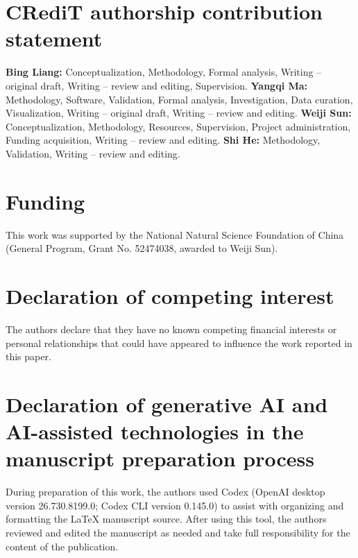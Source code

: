 \documentclass[preprint,12pt]{elsarticle}
\theoremstyle{definition}
\begin{document}
\section*{CRediT authorship contribution statement}
\textbf{Bing Liang:} Conceptualization, Methodology, Formal analysis, Writing -- original draft, Writing -- review and editing, Supervision. \textbf{Yangqi Ma:} Methodology, Software, Validation, Formal analysis, Investigation, Data curation, Visualization, Writing -- original draft, Writing -- review and editing. \textbf{Weiji Sun:} Conceptualization, Methodology, Resources, Supervision, Project administration, Funding acquisition, Writing -- review and editing. \textbf{Shi He:} Methodology, Validation, Writing -- review and editing.

\section*{Funding}
This work was supported by the National Natural Science Foundation of China (General Program, Grant No. 52474038, awarded to Weiji Sun).

\section*{Declaration of competing interest}
The authors declare that they have no known competing financial interests or personal relationships that could have appeared to influence the work reported in this paper.

\section*{Declaration of generative AI and AI-assisted technologies in the manuscript preparation process}
During preparation of this work, the authors used Codex (OpenAI desktop version 26.730.8199.0; Codex CLI version 0.145.0) to assist with organizing and formatting the LaTeX manuscript source. After using this tool, the authors reviewed and edited the manuscript as needed and take full responsibility for the content of the publication.



\end{document}
